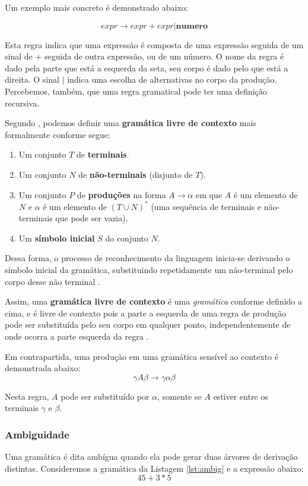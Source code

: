 Um exemplo mais concreto é demonstrado abaixo:

\[
expr \rightarrow expr + expr | \textbf{numero}
\]

Esta regra indica que uma expressão é composta de uma expressão seguida de um
sinal de + seguida de outra expressão, ou de um número. O nome da regra é dado
pela parte que está a esquerda da seta, seu corpo é dado pelo que está a
direita. O sinal \(|\) indica uma escolha de alternativas no corpo da
produção. Percebemos, também, que uma regra gramatical pode ter uma
definição recursiva.

Segundo , podemos definir uma \textbf{gramática livre de
contexto} mais formalmente conforme segue:
\begin{enumerate}
	\item Um conjunto \(T\) de \textbf{terminais}.
	\item Um conjunto \(N\) de \textbf{não-terminais} (disjunto de \(T\)).
	\item Um conjunto \(P\) de \textbf{produções} na forma \(A \rightarrow \alpha\)
				em que \(A\) é um elemento de \(N\) e \(\alpha\) é um elemento de
				\((T \cup N)^*\) (uma sequência de terminais e não-terminais que
				pode ser vazia).
	\item Um \textbf{símbolo inicial} \(S\) do conjunto \(N\).
\end{enumerate}

Dessa forma, o processo de reconhecimento da linguagem inicia-se derivando o
símbolo inicial da gramática, substituindo repetidamente um não-terminal pelo
corpo desse não terminal \cite{new-dragon-pt}.

Assim, uma \textbf{gramática livre de contexto} é uma \emph{gramática}
conforme definido a cima, e é livre de contexto pois a parte a esquerda de uma
regra de produção pode ser substituída pelo seu corpo em qualquer ponto,
independentemente de onde ocorra a parte esquerda da regra \cite{louden97-pt}.

Em contrapartida, uma produção em uma gramática sensível ao contexto é demonstrada
abaixo:
\[
	\gamma{}A{}\beta \rightarrow \gamma\alpha\beta
\]

Nesta regra, \(A\) pode ser substituído por \(\alpha\), somente se
\(A\) estiver entre os terminais \(\gamma\) e \(\beta\).

\subsubsection{Ambiguidade}
\label{sec:ambig}
Uma gramática é dita ambígua quando ela pode gerar duas árvores de derivação
distintas. Consideremos a gramática da Listagem \ref{lst:ambig} e a expressão
abaixo:
$$
45 + 3 * 5
$$

